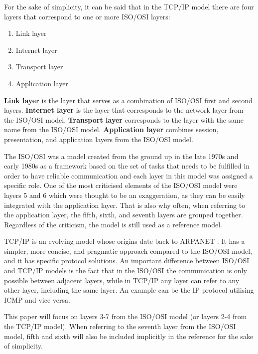 For the sake of simplicity, it can be said that in the TCP/IP model there are four layers that correspond to one or more ISO/OSI layers:
\begin{enumerate}
    \item Link layer
    \item Internet layer
    \item Transport layer
    \item Application layer
\end{enumerate}
\textbf{Link layer} is the layer that serves as a combination of ISO/OSI first and second layers. \textbf{Internet layer} is the layer that corresponds to the network layer from the ISO/OSI model. \textbf{Transport layer} corresponds to the layer with the same name from the ISO/OSI model. \textbf{Application layer} combines session, presentation, and application layers from the ISO/OSI model.

The ISO/OSI was a model created from the ground up in the late 1970s and early 1980s as a framework based on the set of tasks that needs to be fulfilled in order to have reliable communication and each layer in this model was assigned a specific role. One of the most criticised elements of the ISO/OSI model were layers 5 and 6 which were thought to be an exaggeration, as they can be easily integrated with the application layer. That is also why often, when referring to the application layer, the fifth, sixth, and seventh layers are grouped together. Regardless of the criticism, the model is still used as a reference model.

TCP/IP is an evolving model whose origins date back to ARPANET \cite{rfc1}. It has a simpler, more concise, and pragmatic approach compared to the ISO/OSI model, and it has specific protocol solutions. An important difference between ISO/OSI and TCP/IP models is the fact that in the ISO/OSI the communication is only possible between adjacent layers, while in TCP/IP any layer can refer to any other layer, including the same layer. An example can be the IP protocol utilising ICMP and vice versa.

This paper will focus on layers 3-7 from the ISO/OSI model (or layers 2-4 from the TCP/IP model). When referring to the seventh layer from the ISO/OSI model, fifth and sixth will also be included implicitly in the reference for the sake of simplicity.


